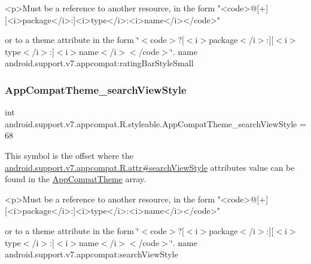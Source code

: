 \begin{DoxyVerb}      <p>Must be a reference to another resource, in the form "<code>@[+][<i>package</i>:]<i>type</i>:<i>name</i></code>"
\end{DoxyVerb}
 or to a theme attribute in the form \char`\"{}$<$code$>$?\mbox{[}$<$i$>$package$<$/i$>$\+:\mbox{]}\mbox{[}$<$i$>$type$<$/i$>$\+:\mbox{]}$<$i$>$name$<$/i$>$$<$/code$>$\char`\"{}.  name android.\+support.\+v7.\+appcompat\+:rating\+Bar\+Style\+Small \mbox{\label{classandroid_1_1support_1_1v7_1_1appcompat_1_1R_1_1styleable_a0dd40ca8d5fe4531e45a7f4d0c4cc276}} 
\subsubsection{\texorpdfstring{App\+Compat\+Theme\+\_\+search\+View\+Style}{AppCompatTheme\_searchViewStyle}}
{\footnotesize\ttfamily int android.\+support.\+v7.\+appcompat.\+R.\+styleable.\+App\+Compat\+Theme\+\_\+search\+View\+Style = 68\hspace{0.3cm}{\ttfamily [static]}}

This symbol is the offset where the \hyperlink{classandroid_1_1support_1_1v7_1_1appcompat_1_1R_1_1attr_a3b487a2c2eeefc8dd4642311349b1a22}{android.\+support.\+v7.\+appcompat.\+R.\+attr\#search\+View\+Style} attribute\textquotesingle{}s value can be found in the \hyperlink{classandroid_1_1support_1_1v7_1_1appcompat_1_1R_1_1styleable_a5c42f89e8a410c323be34208d75c430b}{App\+Compat\+Theme} array.

\begin{DoxyVerb}      <p>Must be a reference to another resource, in the form "<code>@[+][<i>package</i>:]<i>type</i>:<i>name</i></code>"
\end{DoxyVerb}
 or to a theme attribute in the form \char`\"{}$<$code$>$?\mbox{[}$<$i$>$package$<$/i$>$\+:\mbox{]}\mbox{[}$<$i$>$type$<$/i$>$\+:\mbox{]}$<$i$>$name$<$/i$>$$<$/code$>$\char`\"{}.  name android.\+support.\+v7.\+appcompat\+:search\+View\+Style \mbox{\label{classandroid_1_1support_1_1v7_1_1appcompat_1_1R_1_1styleable_a082b50a47359f28a983cbc03e6d51289}} 
